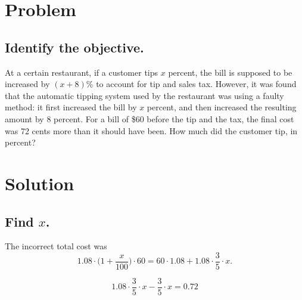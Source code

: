 \documentclass{beamer} %
\begin{document}
\begin{frame} %
  \titlepage
\end{frame}

\section{Problem}

\subsection*{Identify the objective.}

\begin{frame}
  At a certain restaurant, if a customer tips $x$ percent, the bill is supposed to be increased by $(x + 8) \%$ to account for tip and sales tax. However, it was found that the automatic tipping system used by the restaurant was using a faulty method: it first increased the bill by $x$ percent, and then increased the resulting amount by $8$ percent. For a bill of \$60 before the tip and the tax, the final cost was 72 cents more than it should have been. How much did the customer tip, in percent?
\end{frame}

\section{Solution}

\subsection*{Find \texorpdfstring{$x$}{x}.}

\begin{frame}
  The incorrect total cost was
  \[1.08 \cdot \biggl(1+\frac{x}{100}\biggr) \cdot 60 = 60 \cdot 1.08 + 1.08 \cdot \frac{3}{5}\cdot x.\]
\end{frame}

\begin{frame}
  \[1.08 \cdot \frac{3}{5} \cdot x - \frac{3}{5} \cdot x = 0.72\]
\end{frame}
\end{document}
